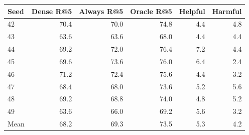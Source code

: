 \begin{tabular}{lrrrrr}
\toprule
Seed & Dense R@5 & Always R@5 & Oracle R@5 & Helpful & Harmful \\
\midrule
42 & 70.4 & 70.0 & 74.8 & 4.4 & 4.8 \\
43 & 63.6 & 63.6 & 68.0 & 4.4 & 4.4 \\
44 & 69.2 & 72.0 & 76.4 & 7.2 & 4.4 \\
45 & 69.6 & 73.6 & 76.0 & 6.4 & 2.4 \\
46 & 71.2 & 72.4 & 75.6 & 4.4 & 3.2 \\
47 & 68.4 & 68.0 & 73.6 & 5.2 & 5.6 \\
48 & 69.2 & 68.8 & 74.0 & 4.8 & 5.2 \\
49 & 63.6 & 66.0 & 69.2 & 5.6 & 3.2 \\
\midrule
Mean & 68.2 & 69.3 & 73.5 & 5.3 & 4.2 \\
\bottomrule
\end{tabular}
